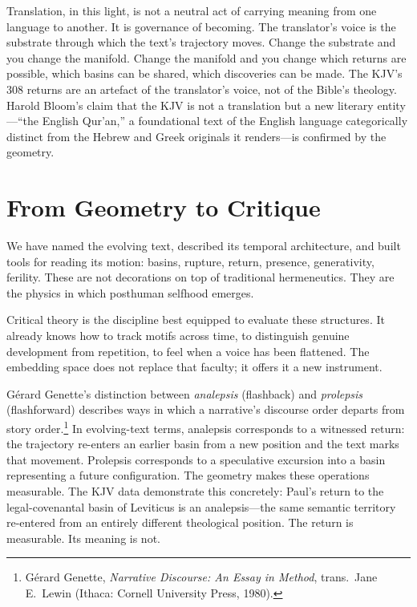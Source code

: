 Translation, in this light, is not a neutral act of carrying meaning from one language to another. It is governance of becoming. The translator's voice is the substrate through which the text's trajectory moves. Change the substrate and you change the manifold. Change the manifold and you change which returns are possible, which basins can be shared, which discoveries can be made. The KJV's 308 returns are an artefact of the translator's voice, not of the Bible's theology. Harold Bloom's claim that the KJV is not a translation but a new literary entity---``the English Qur'an,'' a foundational text of the English language categorically distinct from the Hebrew and Greek originals it renders---is confirmed by the geometry.


\section{From Geometry to Critique}

We have named the evolving text, described its temporal architecture, and built tools for reading its motion: basins, rupture, return, presence, generativity, ferility. These are not decorations on top of traditional hermeneutics. They are the physics in which posthuman selfhood emerges.

Critical theory is the discipline best equipped to evaluate these structures. It already knows how to track motifs across time, to distinguish genuine development from repetition, to feel when a voice has been flattened. The embedding space does not replace that faculty; it offers it a new instrument.

G\'{e}rard Genette's distinction between \emph{analepsis} (flashback) and \emph{prolepsis} (flashforward) describes ways in which a narrative's discourse order departs from story order.\footnote{G\'{e}rard Genette, \emph{Narrative Discourse: An Essay in Method}, trans.\ Jane E.\ Lewin (Ithaca: Cornell University Press, 1980).} In evolving-text terms, analepsis corresponds to a witnessed return: the trajectory re-enters an earlier basin from a new position and the text marks that movement. Prolepsis corresponds to a speculative excursion into a basin representing a future configuration. The geometry makes these operations measurable. The KJV data demonstrate this concretely: Paul's return to the legal-covenantal basin of Leviticus is an analepsis---the same semantic territory re-entered from an entirely different theological position. The return is measurable. Its meaning is not.

